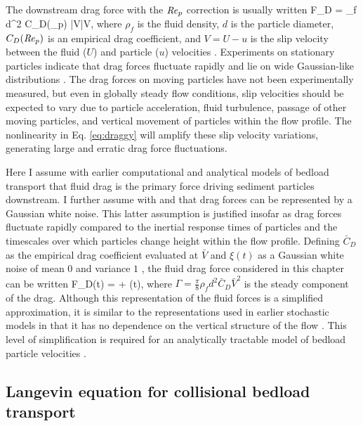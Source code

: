The downstream drag force with the $\mbox{\textit{Re}}_p$ correction is usually written 
\be F_D =  \rho_f d^2 C_D(\Rey_p) |V|V, \label{eq:draggy}\ee
where $\rho_f$ is the fluid density, $d$ is the particle diameter, $C_D(\mbox{\textit{Re}}_p)$ is an empirical drag coefficient, and $V = U-u$ is the slip velocity between the fluid ($U$) and particle ($u$) velocities \citep{Coleman1967, Schmeeckle2007, Dwivedi2012}.
Experiments on stationary particles indicate that drag forces fluctuate rapidly and lie on wide Gaussian-like distributions \citep{Hofland2006,Schmeeckle2007,Dwivedi2010,Celik2014}.
The drag forces on moving particles have not been experimentally measured, but even in globally steady flow conditions, slip velocities should be expected to vary due to particle acceleration, fluid turbulence, passage of other moving particles, and vertical movement of particles within the flow profile.
The nonlinearity in Eq. \ref{eq:draggy} will amplify these slip velocity variations, generating large and erratic drag force fluctuations.

Here I assume with earlier computational \citep{Schmeeckle2014,Gonzalez2017,Elghannay2017} and analytical \citep[e.g.][]{Ancey2014,Fan2014} models of bedload transport that fluid drag is the primary force driving sediment particles downstream. I further assume with \citet{Fan2014} and \citet{Ancey2014} that drag forces can be represented by a Gaussian white noise.
This latter assumption is justified insofar as drag forces fluctuate rapidly compared to the inertial response times of particles and the timescales over which particles change height within the flow profile.
Defining $\bar{C}_D$ as the empirical drag coefficient evaluated at $\bar{V}$ and $\xi(t)$ as a Gaussian white noise of mean $0$ and variance $1$ \citep[e.g.][]{Gardiner1983}, the fluid drag force considered in this chapter can be written
\be F_D(t) = \Gamma +  \eta(t), \label{eq:drag}\ee
where $\Gamma = \frac{\pi}{8}
\rho_f d^2 \bar{C}_D \bar{V}^2$ is the steady component of the drag.
Although this representation of the fluid forces is a simplified approximation, it is similar to the representations used in earlier stochastic models in that it has no dependence on the vertical structure of the flow \citep[e.g.][]{Fan2014,Ancey2014}. This level of simplification is required for an analytically tractable model of bedload particle velocities \citep[e.g.][]{Michaelides1997}.

\subsection{Langevin equation for collisional bedload transport}

